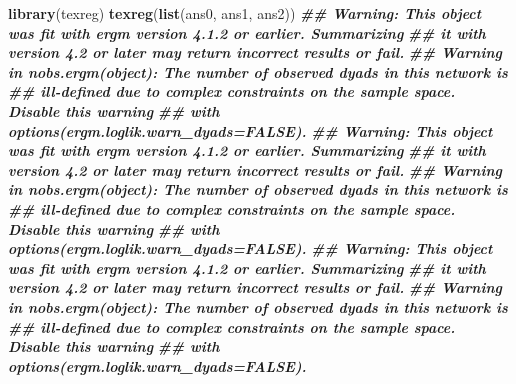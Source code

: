 \documentclass[
]{book}
\newenvironment{Shaded}{\begin{snugshade}}{\end{snugshade}}
\newcommand{\DocumentationTok}[1]{\textcolor[rgb]{0.56,0.35,0.01}{\textbf{\textit{#1}}}}
\newcommand{\FunctionTok}[1]{\textcolor[rgb]{0.13,0.29,0.53}{\textbf{#1}}}
\newcommand{\NormalTok}[1]{#1}
\begin{document}
\begin{Shaded}
\begin{Highlighting}[]
\FunctionTok{library}\NormalTok{(texreg)}
\FunctionTok{texreg}\NormalTok{(}\FunctionTok{list}\NormalTok{(ans0, ans1, ans2))}
\DocumentationTok{\#\# Warning: This object was fit with \textquotesingle{}ergm\textquotesingle{} version 4.1.2 or earlier. Summarizing}
\DocumentationTok{\#\# it with version 4.2 or later may return incorrect results or fail.}
\DocumentationTok{\#\# Warning in nobs.ergm(object): The number of observed dyads in this network is}
\DocumentationTok{\#\# ill{-}defined due to complex constraints on the sample space. Disable this warning}
\DocumentationTok{\#\# with \textquotesingle{}options(ergm.loglik.warn\_dyads=FALSE)\textquotesingle{}.}
\DocumentationTok{\#\# Warning: This object was fit with \textquotesingle{}ergm\textquotesingle{} version 4.1.2 or earlier. Summarizing}
\DocumentationTok{\#\# it with version 4.2 or later may return incorrect results or fail.}
\DocumentationTok{\#\# Warning in nobs.ergm(object): The number of observed dyads in this network is}
\DocumentationTok{\#\# ill{-}defined due to complex constraints on the sample space. Disable this warning}
\DocumentationTok{\#\# with \textquotesingle{}options(ergm.loglik.warn\_dyads=FALSE)\textquotesingle{}.}
\DocumentationTok{\#\# Warning: This object was fit with \textquotesingle{}ergm\textquotesingle{} version 4.1.2 or earlier. Summarizing}
\DocumentationTok{\#\# it with version 4.2 or later may return incorrect results or fail.}
\DocumentationTok{\#\# Warning in nobs.ergm(object): The number of observed dyads in this network is}
\DocumentationTok{\#\# ill{-}defined due to complex constraints on the sample space. Disable this warning}
\DocumentationTok{\#\# with \textquotesingle{}options(ergm.loglik.warn\_dyads=FALSE)\textquotesingle{}.}
\end{Highlighting}
\end{Shaded}
\end{document}
